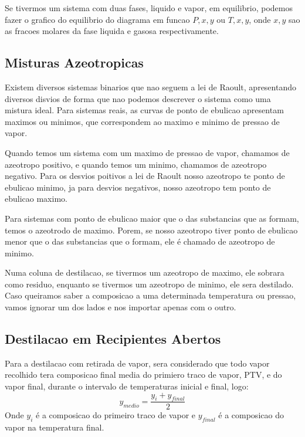 Se tivermos um sistema com duas fases, liquido e vapor, em equilibrio, podemos fazer o grafico do
equilibrio do diagrama em funcao \(P, x, y\) ou  \(T, x, y\), onde \(x, y\) sao as fracoes molares
da fase liquida e gasosa respectivamente.\par
\subsection{Misturas Azeotropicas}
Existem diversos sistemas binarios que nao seguem a lei de Raoult, apresentando diversos disvios de
forma que nao podemos descrever o sistema como uma mistura ideal. Para sistemas reais, as curvas de
ponto de ebulicao apresentam maximos ou minimos, que correspondem ao maximo e minimo de pressao de
vapor. \par

Quando temos um sistema com um maximo de pressao de vapor, chamamos de azeotropo positivo, e quando
temos um minimo, chamamos de azeotropo negativo. Para os desvios poitivos a lei de Raoult nosso
azeotropo te ponto de ebulicao minimo, ja para desvios negativos, nosso azeotropo tem ponto de
ebulicao maximo.\par

Para sistemas com ponto de ebulicao maior que o das substancias que as formam, temos o azeotrodo de
maximo. Porem, se nosso azeotropo tiver ponto de ebulicao menor que o das substancias que o formam,
ele é chamado de azeotropo de minimo.\par 

Numa coluna de destilacao, se tivermos um azeotropo de maximo, ele sobrara como residuo, enquanto se
tivermos um azeotropo de minimo, ele sera destilado. Caso queiramos saber a composicao a uma
determinada temperatura ou pressao, vamos ignorar um dos lados e nos importar apenas com o outro.
\par

\subsection{Destilacao em Recipientes Abertos}
Para a destilacao com retirada de vapor, sera considerado que todo vapor recolhido tera composicao
final media do primiero traco de vapor, PTV, e do vapor final, durante o intervalo de temperaturas
inicial e final, logo:
\begin{equation}
    y_{medio} = \frac{y_{i} + y_{final}}{2}
\end{equation}
Onde \(y_{i}\) é a composicao do primeiro traco de vapor e \(y_{final}\) é a composicao do vapor
na temperatura final. \par
